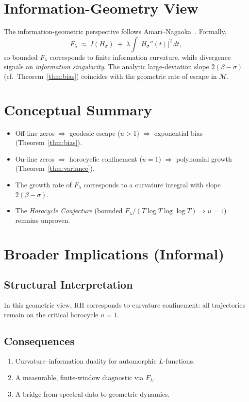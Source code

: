 \section{Information-Geometry View}\label{sec:info-geometry}

The information-geometric perspective follows Amari--Nagaoka~\cite{amari}.
Formally,
\[
F_\lambda \;\approx\; I(H_\sigma)
  \;+\; \lambda\!\int |H_\sigma''(t)|^2\,dt,
\]
so bounded $F_\lambda$ corresponds to finite information curvature,
while divergence signals an \emph{information singularity}.
The analytic large-deviation slope $2(\beta-\sigma)$
(cf.~Theorem~\ref{thm:bias}) coincides with the geometric rate of escape
in $\mathcal{M}$.

\section{Conceptual Summary}

\begin{itemize}
  \item Off-line zeros $\Rightarrow$ geodesic escape ($u>1$) $\Rightarrow$ exponential bias (Theorem~\ref{thm:bias}).  
  \item On-line zeros $\Rightarrow$ horocyclic confinement ($u=1$) $\Rightarrow$ polynomial growth (Theorem~\ref{thm:variance}).  
  \item The growth rate of $F_\lambda$ corresponds to a curvature integral with slope $2(\beta-\sigma)$.  
  \item The \emph{Horocycle Conjecture}
        (bounded $F_\lambda/(T\log T\log\log T)\Rightarrow u=1$) remains unproven.  
\end{itemize}

\section{Broader Implications (Informal)}

\subsection{Structural Interpretation}
In this geometric view, RH corresponds to curvature confinement:
all trajectories remain on the critical horocycle $u=1$.

\subsection{Consequences}
\begin{enumerate}
  \item Curvature–information duality for automorphic $L$-functions.
  \item A measurable, finite-window diagnostic via $F_\lambda$.
  \item A bridge from spectral data to geometric dynamics.
\end{enumerate}

